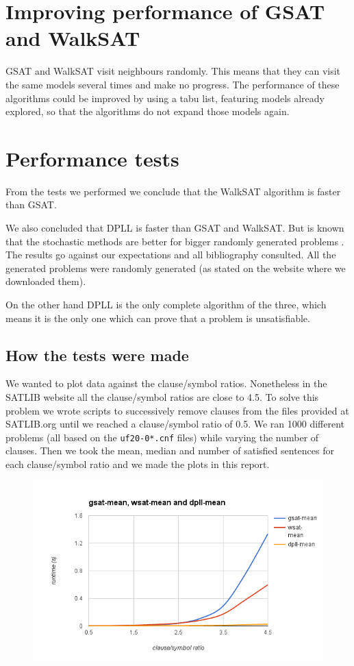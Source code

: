 \documentclass[12pt,a4paper]{article}
\begin{document}
{\section{Improving performance of GSAT and WalkSAT}

GSAT and WalkSAT visit neighbours randomly. This means that they can visit the same models several times and make no progress. The performance of these algorithms could be improved by using a tabu list, featuring models already explored, so that the algorithms do not expand those models again.


\section{Performance tests}

From the tests we performed we conclude that the WalkSAT algorithm is faster than GSAT.

We also concluded that DPLL is faster than GSAT and WalkSAT. But is known that the stochastic methods are better for bigger randomly generated problems \cite{dpll_art}. The results go against our expectations and all bibliography consulted. All the generated problems were randomly generated (as stated on the website where we downloaded them). 

On the other hand DPLL is the only complete algorithm of the three, which means it is the only one which can prove that a problem is unsatisfiable.

\subsection{How the tests were made}

We wanted to plot data against the clause/symbol ratios. Nonetheless in the SATLIB website all the clause/symbol ratios are close to 4.5. To solve this problem we wrote scripts to successively remove clauses from the files provided at SATLIB.org until we reached a clause/symbol ratio of 0.5. We ran 1000 different problems (all based on the \texttt{uf20-0*.cnf} files) while varying the number of clauses. Then we took the mean, median and number of satisfied sentences for each clause/symbol ratio and we made the plots in this report.

\begin{figure}[htbp]
\includegraphics[width=\textwidth]{CS_mean}
\end{figure}

}
\end{document}
